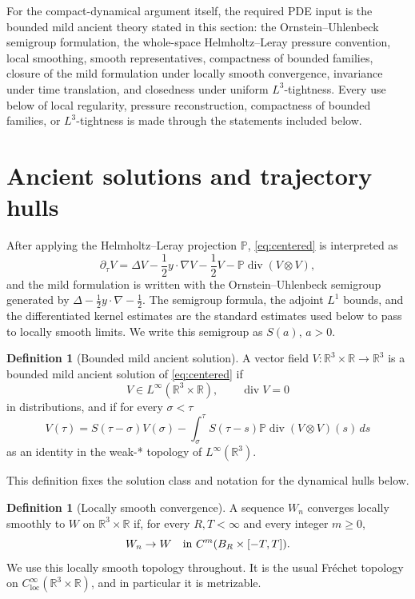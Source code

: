 \documentclass[11pt]{amsart}
\theoremstyle{plain}
\theoremstyle{definition}
\newtheorem{definition}[theorem]{Definition}
\theoremstyle{remark}
\numberwithin{equation}{section}
\begin{document}
For the compact-dynamical argument itself, the required PDE input is the
bounded mild ancient theory stated in this section: the Ornstein--Uhlenbeck
semigroup formulation, the whole-space Helmholtz--Leray pressure convention,
local smoothing, smooth representatives, compactness of bounded families,
closure of the mild formulation under locally smooth convergence, invariance
under time translation, and closedness under uniform \(L^3\)-tightness.  Every
use below of local regularity, pressure reconstruction, compactness of bounded
families, or \(L^3\)-tightness is made through the statements included below.

\section{Ancient solutions and trajectory hulls}

After applying the Helmholtz--Leray
projection \(\mathbb P\), \eqref{eq:centered} is interpreted as
\[
   \partial_\tau V
   =
   \Delta V-\frac12y\cdot\nabla V-\frac12V
   -\mathbb P\operatorname{div}(V\otimes V),
\]
and the mild formulation is written with the Ornstein--Uhlenbeck semigroup
generated by \(\Delta-\frac12y\cdot\nabla-\frac12\).  The semigroup formula,
the adjoint \(L^1\) bounds, and the differentiated kernel estimates are the
standard estimates used below to pass to locally smooth limits.  We write this
semigroup as \(S(a)\), \(a>0\).

\begin{definition}[Bounded mild ancient solution]\label{def:mild}
A vector field \(V:\mathbb R^3\times\mathbb R\to\mathbb R^3\) is a bounded mild
ancient solution of \eqref{eq:centered} if
\[
   V\in L^\infty(\mathbb R^3\times\mathbb R),\qquad \operatorname{div}V=0
\]
in distributions, and if for every \(\sigma<\tau\)
\begin{equation}\label{eq:mild}
   V(\tau)
   =
   S(\tau-\sigma)V(\sigma)
   -
   \int_\sigma^\tau
   S(\tau-s)\mathbb P\operatorname{div}(V\otimes V)(s)\,ds
\end{equation}
as an identity in the weak-* topology of \(L^\infty(\mathbb R^3)\).
\end{definition}

This definition fixes the solution class and notation for the dynamical hulls
below.

\begin{definition}[Locally smooth convergence]\label{def:local-smooth}
A sequence \(W_n\) converges locally smoothly to \(W\) on
\(\mathbb R^3\times\mathbb R\) if, for every \(R,T<\infty\) and every integer
\(m\ge0\),
\[
   W_n\to W
   \quad\hbox{in }C^m(B_R\times[-T,T]).
\]
We use this locally smooth topology throughout.  It is the usual Fr\'echet
topology on \(C^\infty_{\mathrm{loc}}(\mathbb R^3\times\mathbb R)\), and in
particular it is metrizable.
\end{definition}
\end{document}
